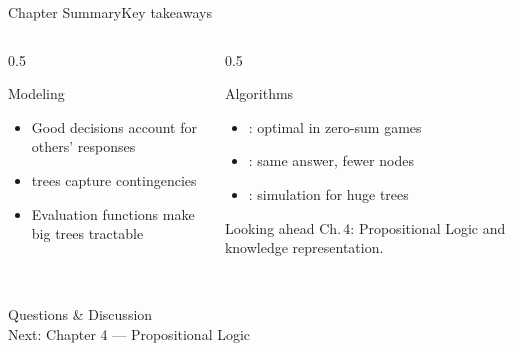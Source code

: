 \documentclass[aspectratio=169,11pt]{beamer}
\begin{document}
\begin{frame}{Chapter Summary}{Key takeaways}
  \begin{columns}[T]
    \begin{column}{0.5\textwidth}
      \begin{block}{Modeling}
        \small
        \begin{itemize}
          \item Good decisions account for others' responses
          \item {} trees capture contingencies
          \item Evaluation functions make big trees tractable
        \end{itemize}
      \end{block}
    \end{column}
    \begin{column}{0.5\textwidth}
      \begin{exampleblock}{Algorithms}
        \small
        \begin{itemize}
          \item {}: optimal in zero-sum games
          \item {}: same answer, fewer nodes
          \item {}: simulation for huge trees
        \end{itemize}
      \end{exampleblock}
      \begin{alertblock}{Looking ahead}
        \small Ch.\,4: Propositional Logic and knowledge representation.
      \end{alertblock}
    \end{column}
  \end{columns}
\end{frame}

{
\begin{frame}
  \vfill
  \begin{center}
    {\LARGE\textcolor{white}{\textbf{Thank you!}}}\\[0.6em]
    {\small\textcolor{PrimaryLight}{Questions \& Discussion}}\\[1.2em]
    {\footnotesize\textcolor{AccentYellow}{Next: Chapter 4 — Propositional Logic}}
  \end{center}
  \vfill
\end{frame}}
\end{document}
